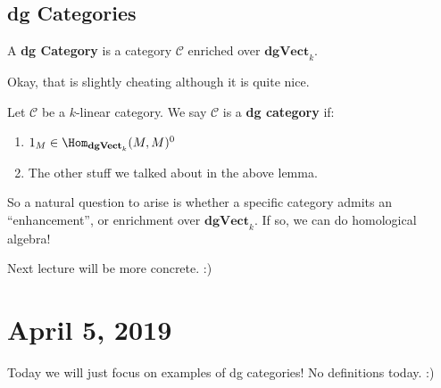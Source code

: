 \documentclass[12pt]{article}
\newcommand*{\dgVectk}{\mathbf{dgVect}_k}
\begin{document}
\subsection{dg Categories}
\begin{defn}
	A \textbf{dg Category} is a category $\mathcal C$ enriched over $\dgVectk$.
\end{defn}
Okay, that is slightly cheating although it is quite nice. 
\begin{defn}
	Let $\mathcal C$ be a $k$-linear category. We say $\mathcal C$ is a \textbf{dg category} if:
	\begin{enumerate}
		\item $1_M\in\Hom_{\dgVectk}(M,M)^0$
		\item The other stuff we talked about in the above lemma.
	\end{enumerate}
\end{defn}
\begin{rmk}
	So a natural question to arise is whether a specific category admits an ``enhancement'', or enrichment 
	over $\dgVectk$. If so, we can do homological algebra!

	Next lecture will be more concrete. :)
\end{rmk}

\section{April 5, 2019}
Today we will just focus on examples of dg categories! No definitions today. :)
\end{document}
